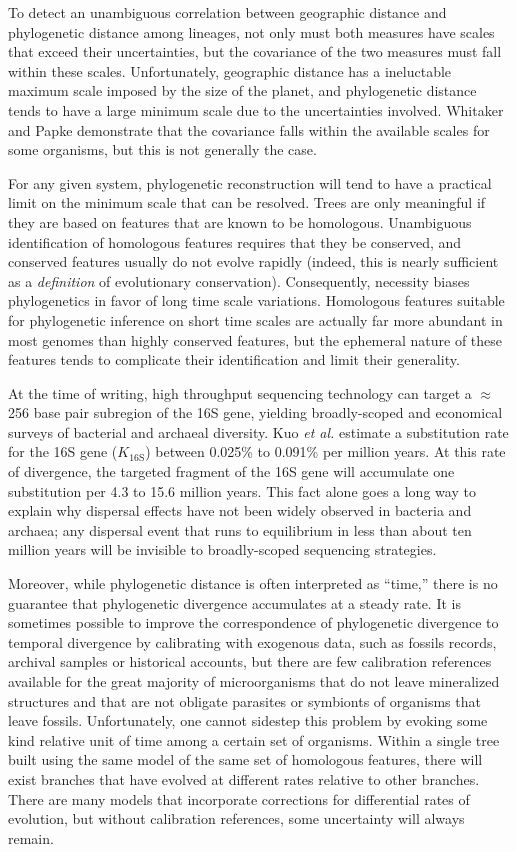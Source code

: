 To detect an unambiguous correlation between geographic distance and phylogenetic distance among lineages, not only must both measures have scales that exceed their uncertainties, but the covariance of the two measures must fall within these scales. Unfortunately, geographic distance has a ineluctable maximum scale imposed by the size of the planet, and phylogenetic distance tends to have a large minimum scale due to the uncertainties involved. Whitaker and Papke demonstrate that the covariance falls within the available scales for some organisms, but this is not generally the case.

For any given system, phylogenetic reconstruction will tend to have a practical limit on the minimum scale that can be resolved. Trees are only meaningful if they are based on features that are known to be homologous. Unambiguous identification of homologous features requires that they be conserved, and conserved features usually do not evolve rapidly (indeed, this is nearly sufficient as a {\em definition} of evolutionary conservation). Consequently, necessity biases phylogenetics in favor of long time scale variations. Homologous features suitable for phylogenetic inference on short time scales are actually far more abundant in most genomes than highly conserved features, but the ephemeral nature of these features tends to complicate their identification and limit their generality. 

At the time of writing, high throughput sequencing technology can target a $\approx$ 256 base pair subregion of the 16S gene, yielding broadly-scoped and economical surveys of bacterial and archaeal diversity. Kuo {\em et al.} estimate a substitution rate for the 16S gene ($K_{\mathrm{16S}}$) between 0.025\% to 0.091\% per million years. \cite{kuo2009inferring} At this rate of divergence, the targeted fragment of the 16S gene will accumulate one substitution per 4.3 to 15.6 million years. This fact alone goes a long way to explain why dispersal effects have not been widely observed in bacteria and archaea; any dispersal event that runs to equilibrium in less than about ten million years will be invisible to broadly-scoped sequencing strategies.

Moreover, while phylogenetic distance is often interpreted as ``time,'' there is no guarantee that phylogenetic divergence accumulates at a steady rate. It is sometimes possible to improve the correspondence of phylogenetic divergence to temporal divergence by calibrating with exogenous data, such as fossils records, archival samples or historical accounts, but there are few calibration references available for the great majority of microorganisms that do not leave mineralized structures and that are not obligate parasites or symbionts of organisms that leave fossils. Unfortunately, one cannot sidestep this problem by evoking some kind relative unit of time among a certain set of organisms. Within a single tree built using the same model of the same set of homologous features, there will exist branches that have evolved at different rates relative to other branches. There are many models that incorporate corrections for differential rates of evolution, but without calibration references, some uncertainty will always remain.

